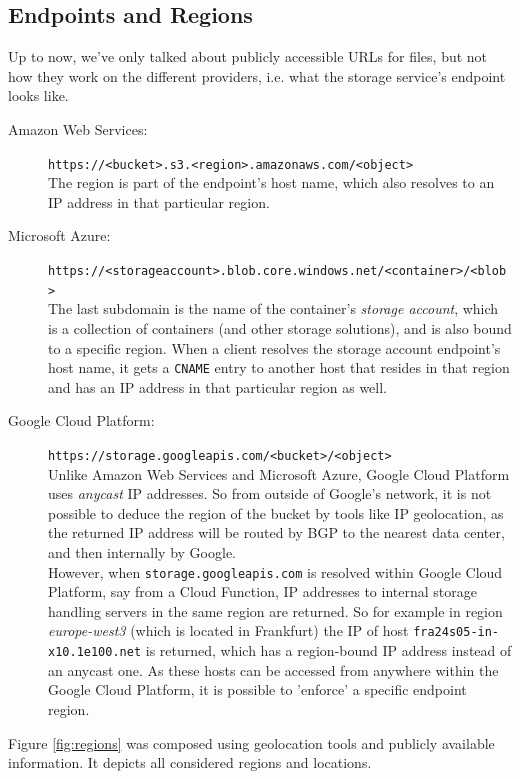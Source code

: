 \documentclass[a4paper,bibliography=totoc]{scrartcl}
\newcommand{\Azure}{Microsoft Azure\xspace}
\newcommand{\GCP}{Google Cloud Platform\xspace}
\newcommand{\AWS}{Amazon Web Services\xspace}
\begin{document}
\subsection{Endpoints and Regions}\label{sec:endpoints}
Up to now, we've only talked about publicly accessible URLs for files, but not how they work on the different providers, i.e. what the storage service's endpoint looks like.
\begin{description}
    \item[\AWS:] \texttt{https://<bucket>.s3.<region>.amazonaws.com/<object>}\cite{aws_s3_access}\\
    The region is part of the endpoint's host name, which also resolves to an IP address in that particular region. 
    \item[\Azure:] \texttt{https://<storageaccount>.blob.core.windows.net/<container>/<blob>}\cite{azure_storage_access}\\
    The last subdomain is the name of the container's \textit{storage account}, which is a collection of containers (and other storage solutions), and is also bound to a specific region.\cite{azure_storage_accounts} When a client resolves the storage account endpoint's host name, it gets a \texttt{CNAME} entry to another host that resides in that region and has an IP address in that particular region as well.
    \item[\GCP:] \texttt{https://storage.googleapis.com/<bucket>/<object>}\cite{gcp_storage_acces}\\
    Unlike \AWS and \Azure, \GCP uses \textit{anycast} IP addresses.\cite{cloudflare_anycast} So from outside of Google's network, it is not possible to deduce the region of the bucket by tools like IP geolocation, as the returned IP address will be routed by BGP to the nearest data center, and then internally by Google.\\
    However, when \texttt{storage.googleapis.com} is resolved within \GCP, say from a Cloud Function, IP addresses to internal storage handling servers in the same region are returned. So for example in region \textit{europe-west3} (which is located in Frankfurt) the IP of host \texttt{fra24s05-in-x10.1e100.net} is returned, which has a region-bound IP address instead of an anycast one. As these hosts can be accessed from anywhere within the \GCP, it is possible to 'enforce' a specific endpoint region.
\end{description}
Figure \ref{fig:regions} was composed using geolocation tools and publicly available information.\cite{aws_regions,azure_regions,gcp_regions} It depicts all considered regions and locations.
\end{document}
